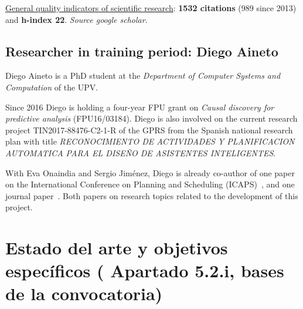 \documentclass[10pt,a4paper]{paper}
\begin{document}
\underline{General quality indicators of scientific research}: {\bf 1532 citations} (989 since 2013) and {\bf h-index 22}. {\scriptsize\em Source google scholar}.


\subsection{Researcher in training period: Diego Aineto}
Diego Aineto is a PhD student at the {\em Department of Computer Systems and Computation} of the UPV.

Since 2016 Diego is holding a four-year FPU grant on {\em Causal discovery for predictive analysis} (FPU16/03184). Diego is also involved on the current research project TIN2017-88476-C2-1-R of the GPRS from the Spanish national research plan with title {\small\em RECONOCIMIENTO DE ACTIVIDADES Y PLANIFICACION AUTOMATICA PARA EL DISEÑO DE ASISTENTES INTELIGENTES}.

With Eva Onaindia and Sergio Jiménez, Diego is already co-author of one paper on the International Conference on Planning and Scheduling (ICAPS)~\cite{diego-icaps18}, and one journal paper~\cite{onaindia2018common}. Both papers on research topics related to the development of this project. 


\newpage
\section{Estado del arte y objetivos específicos ( Apartado 5.2.i, bases de la convocatoria)}
\end{document}
